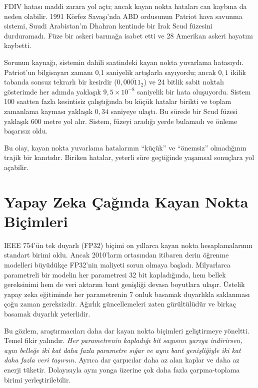 \begin{bilginot}
FDIV hatası maddi zarara yol açtı; ancak kayan nokta hataları can kaybına da neden olabilir. 1991 Körfez Savaşı'nda ABD ordusunun Patriot hava savunma sistemi, Suudi Arabistan'ın Dhahran kentinde bir Irak Scud füzesini durduramadı. Füze bir askeri barınağa isabet etti ve 28 Amerikan askeri hayatını kaybetti.

Sorunun kaynağı, sistemin dahili saatindeki kayan nokta yuvarlama hatasıydı. Patriot'un bilgisayarı zamanı 0{,}1 saniyelik artışlarla sayıyordu; ancak $0{,}1$ ikilik tabanda sonsuz tekrarlı bir kesirdir ($0{,}0\overline{0011}_2$) ve 24 bitlik sabit noktalı gösterimde her adımda yaklaşık $9{,}5 \times 10^{-8}$ saniyelik bir hata oluşuyordu. Sistem 100 saatten fazla kesintisiz çalıştığında bu küçük hatalar birikti ve toplam zamanlama kayması yaklaşık $0{,}34$ saniyeye ulaştı. Bu sürede bir Scud füzesi yaklaşık 600 metre yol alır. Sistem, füzeyi aradığı yerde bulamadı ve önleme başarısız oldu.

Bu olay, kayan nokta yuvarlama hatalarının ``küçük'' ve ``önemsiz'' olmadığının trajik bir kanıtıdır. Biriken hatalar, yeterli süre geçtiğinde yaşamsal sonuçlara yol açabilir.
\end{bilginot}

\section{Yapay Zeka Çağında Kayan Nokta Biçimleri}
\label{sec:yapay-zeka-kayan-nokta}

IEEE 754'ün tek duyarlı (FP32) biçimi on yıllarca kayan nokta hesaplamalarının standart birimi oldu. Ancak 2010'ların ortasından itibaren derin öğrenme modelleri büyüdükçe FP32'nin maliyeti sorun olmaya başladı. Milyarlarca parametreli bir modelin her parametresi 32 bit kapladığında, hem bellek gereksinimi hem de veri aktarım bant genişliği devasa boyutlara ulaşır. Üstelik yapay zeka eğitiminde her parametrenin 7 onluk basamak duyarlıkla saklanması çoğu zaman gereksizdir. Ağırlık güncellemeleri zaten gürültülüdür ve birkaç basamak duyarlık yeterlidir.

Bu gözlem, araştırmacıları daha dar kayan nokta biçimleri geliştirmeye yöneltti. Temel fikir yalındır. \emph{Her parametrenin kapladığı bit sayısını yarıya indirirsen, aynı belleğe iki kat daha fazla parametre sığar ve aynı bant genişliğiyle iki kat daha fazla veri taşırsın.} Ayrıca dar çarpıcılar daha az alan kaplar ve daha az enerji tüketir. Dolayısıyla aynı yonga üzerine çok daha fazla çarpma-toplama birimi yerleştirilebilir.

